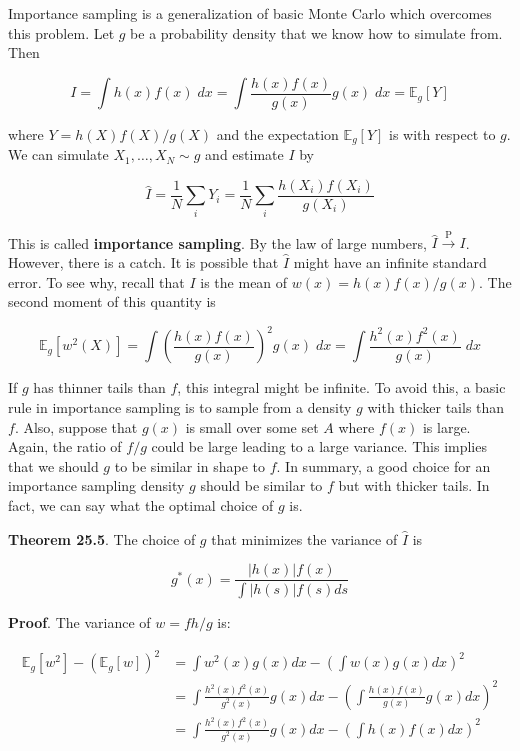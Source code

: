 Importance sampling is a generalization of basic Monte Carlo which
overcomes this problem. Let \(g\) be a probability density that we know
how to simulate from. Then

\[ I = \int h(x) f(x) \; dx = \int \frac{h(x) f(x)}{g(x)} g(x) \; dx  = \mathbb{E}_g[Y] \]

where \(Y = h(X) f(X) / g(X)\) and the expectation \(\mathbb{E}_g[Y]\)
is with respect to \(g\). We can simulate \(X_{1}, \dots, X_N \sim g\) and
estimate \(I\) by

\[ \hat{I} = \frac{1}{N} \sum_{i} Y_{i} = \frac{1}{N} \sum_{i} \frac{h(X_{i}) f(X_{i})}{g(X_{i})} \]

This is called \textbf{importance sampling}. By the law of large
numbers, \(\hat{I} \xrightarrow{\text{P}} I\). However, there is a
catch. It is possible that \(\hat{I}\) might have an infinite standard
error. To see why, recall that \(I\) is the mean of
\(w(x) = h(x) f(x) / g(x)\). The second moment of this quantity is

\[ \mathbb{E}_g[w^{2}(X)] = \int \left( \frac{h(x) f(x)}{g(x)} \right)^{2} g(x) \; dx = \int \frac{h^{2}(x) f^{2}(x)}{g(x)} \; dx\]

If \(g\) has thinner tails than \(f\), this integral might be infinite.
To avoid this, a basic rule in importance sampling is to sample from a
density \(g\) with thicker tails than \(f\). Also, suppose that \(g(x)\)
is small over some set \(A\) where \(f(x)\) is large. Again, the ratio
of \(f / g\) could be large leading to a large variance. This implies
that we should \(g\) to be similar in shape to \(f\). In summary, a good
choice for an importance sampling density \(g\) should be similar to
\(f\) but with thicker tails. In fact, we can say what the optimal
choice of \(g\) is.

\textbf{Theorem 25.5}. The choice of \(g\) that minimizes the variance
of \(\hat{I}\) is

\[ g^*(x) = \frac{|h(x)| f(x) }{\int | h(s) | f(s)  ds} \]

\textbf{Proof}. The variance of \(w = f h / g\) is:

\begin{align*}
\mathbb{E}_g[w^{2}] - (\mathbb{E}_g[w])^{2} &= \int w^{2}(x) g(x) dx - \left( \int w(x) g(x) dx \right)^{2} \\
&= \int \frac{h^{2}(x) f^{2}(x)}{g^{2}(x)} g(x) dx - \left( \int \frac{h(x) f(x)}{g(x)} g(x) dx \right)^{2} \\
&= \int \frac{h^{2}(x) f^{2}(x)}{g^{2}(x)} g(x) dx - \left( \int h(x) f(x) dx \right)^{2}
\end{align*}

